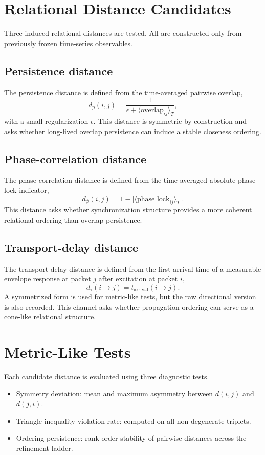 \documentclass[11pt]{article}
\begin{document}
\section{Relational Distance Candidates}

Three induced relational distances are tested. All are constructed only from previously frozen time-series observables.

\subsection{Persistence distance}

The persistence distance is defined from the time-averaged pairwise overlap,
\[
 d_p(i,j) = \frac{1}{\epsilon + \langle \mathrm{overlap}_{ij} \rangle_T},
\]
with a small regularization \(\epsilon\). This distance is symmetric by construction and asks whether long-lived overlap persistence can induce a stable closeness ordering.

\subsection{Phase-correlation distance}

The phase-correlation distance is defined from the time-averaged absolute phase-lock indicator,
\[
 d_{\phi}(i,j) = 1 - \bigl|\langle \mathrm{phase\_lock}_{ij} \rangle_T\bigr|.
\]
This distance asks whether synchronization structure provides a more coherent relational ordering than overlap persistence.

\subsection{Transport-delay distance}

The transport-delay distance is defined from the first arrival time of a measurable envelope response at packet \(j\) after excitation at packet \(i\),
\[
 d_{\tau}(i \rightarrow j) = t_{\mathrm{arrival}}(i \rightarrow j).
\]
A symmetrized form is used for metric-like tests, but the raw directional version is also recorded. This channel asks whether propagation ordering can serve as a cone-like relational structure.

\section{Metric-Like Tests}

Each candidate distance is evaluated using three diagnostic tests.
\begin{itemize}
\item Symmetry deviation: mean and maximum asymmetry between \(d(i,j)\) and \(d(j,i)\).
\item Triangle-inequality violation rate: computed on all non-degenerate triplets.
\item Ordering persistence: rank-order stability of pairwise distances across the refinement ladder.
\end{itemize}
\end{document}
